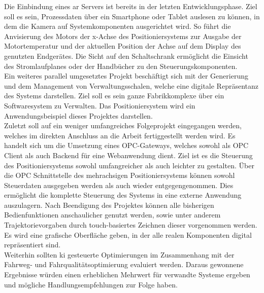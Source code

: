 \documentclass[../../Bachelorarbeit.tex]{subfiles}
\begin{document}
Die Einbindung eines \acs{ar} Servers ist bereits in der letzten Entwicklungsphase. Ziel soll es sein, Prozessdaten über ein Smartphone oder Tablet auslesen zu können, in dem die Kamera auf Systemkomponenten ausgerichtet wird. So führt \zB die Anvisierung des Motors der x-Achse des Positioniersystems zur Ausgabe der Motortemperatur und der aktuellen Position der Achse auf dem Display des genutzten Endgerätes. Die Sicht auf den Schaltschrank ermöglicht \bspw die Einsicht des Stromlaufplanes oder der Handbücher zu den Steuerungskomponenten.\\
Ein weiteres parallel umgesetztes Projekt beschäftigt sich mit der Generierung und dem Management von Verwaltungsschalen, welche eine digitale Repräsentanz des Systems darstellen. Ziel soll es sein ganze Fabrikkomplexe über ein Softwaresystem zu Verwalten. Das Positioniersystem wird ein Anwendungsbeispiel dieses Projektes darstellen.\\
Zuletzt soll auf ein weniger umfangreiches Folgeprojekt eingegangen werden, welches im direkten Anschluss an die Arbeit fertiggestellt werden wird. Es handelt sich um die Umsetzung eines OPC-Gateways, welches sowohl als OPC Client als auch Backend für eine Webanwendung dient. Ziel ist es die Steuerung des Positioniersystems sowohl umfangreicher als auch leichter zu gestalten. Über die OPC Schnittstelle des mehrachsigen Positioniersystems können sowohl Steuerdaten ausgegeben werden als auch wieder entgegengenommen. Dies ermöglicht die komplette Steuerung des Systems in eine externe Anwendung auszulagern. Nach Beendigung des Projektes können alle bisherigen Bedienfunktionen anschaulicher genutzt werden, sowie unter anderem Trajektorievorgaben durch touch-basiertes Zeichnen dieser vorgenommen werden. Es wird eine grafische Oberfläche geben, in der alle realen Komponenten digital repräsentiert sind.\\
\bigskip \newline
Weiterhin sollten \acs{ki} gesteuerte Optimierungen im Zusammenhang mit der Fahrweg- und Fahrqualitätsoptimierung evaluiert werden. Daraus gewonnene Ergebnisse würden einen erheblichen Mehrwert für verwandte Systeme ergeben und mögliche Handlungsempfehlungen zur Folge haben.
\end{document}
